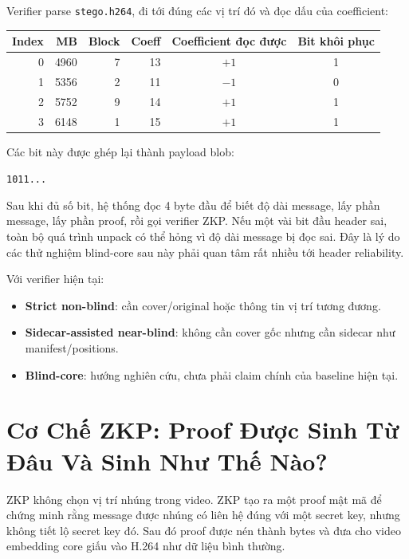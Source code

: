 \documentclass[11pt,a4paper]{article}
\begin{document}
Verifier parse \texttt{stego.h264}, đi tới đúng các vị trí đó và đọc dấu của
coefficient:

\begin{center}
\begin{tabular}{rrrrcc}
\toprule
Index & MB & Block & Coeff & Coefficient đọc được & Bit khôi phục \\
\midrule
0 & 4960 & 7 & 13 & \(+1\) & 1 \\
1 & 5356 & 2 & 11 & \(-1\) & 0 \\
2 & 5752 & 9 & 14 & \(+1\) & 1 \\
3 & 6148 & 1 & 15 & \(+1\) & 1 \\
\bottomrule
\end{tabular}
\end{center}

Các bit này được ghép lại thành payload blob:

\begin{center}
\texttt{1011...}
\end{center}

Sau khi đủ số bit, hệ thống đọc 4 byte đầu để biết độ dài message, lấy phần
message, lấy phần proof, rồi gọi verifier ZKP. Nếu một vài bit đầu header sai,
toàn bộ quá trình unpack có thể hỏng vì độ dài message bị đọc sai. Đây là lý
do các thử nghiệm blind-core sau này phải quan tâm rất nhiều tới header
reliability.

Với verifier hiện tại:

\begin{itemize}[leftmargin=*]
  \item \textbf{Strict non-blind}: cần cover/original hoặc thông tin vị trí tương đương.
  \item \textbf{Sidecar-assisted near-blind}: không cần cover gốc nhưng cần sidecar như manifest/positions.
  \item \textbf{Blind-core}: hướng nghiên cứu, chưa phải claim chính của baseline hiện tại.
\end{itemize}

\section{Cơ Chế ZKP: Proof Được Sinh Từ Đâu Và Sinh Như Thế Nào?}

ZKP không chọn vị trí nhúng trong video. ZKP tạo ra một proof mật mã để chứng
minh rằng message được nhúng có liên hệ đúng với một secret key, nhưng không
tiết lộ secret key đó. Sau đó proof được nén thành bytes và đưa cho video
embedding core giấu vào H.264 như dữ liệu bình thường.
\end{document}
